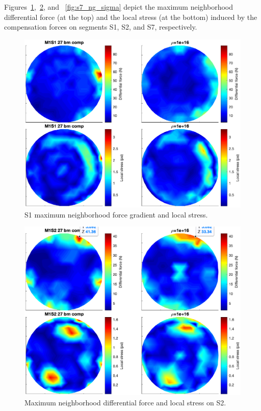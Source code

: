 \documentclass{gmto}
\begin{document}
 Figures~\ref{fig:s1_ng_sigma},~\ref{fig:s2_ng_sigma}, and ~\ref{fig:s7_ng_sigma} depict the maximum neighborhood differential force (at the top) and the local stress (at the bottom) induced by the compensation forces on segments \textsf{S1}, \textsf{S2}, and \textsf{S7}, respectively. %
\begin{figure}[!htb]
\centering
\includegraphics[width=\textwidth]{./pictures/s1_NG_sigma.eps}
\caption{\textsf{S1} maximum neighborhood force gradient and local stress.}
\label{fig:s1_ng_sigma}
\end{figure}
\begin{figure}[!htb]
\centering
\includegraphics[width=\textwidth]{./pictures/s2_NG_sigma.eps}
\caption{Maximum neighborhood differential force and local stress on \textsf{S2}.}
\label{fig:s2_ng_sigma}
\end{figure}
\end{document}
